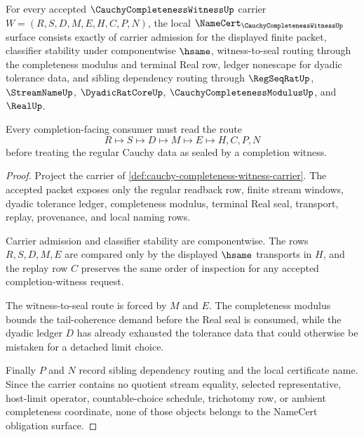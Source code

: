 \begin{theorem}
\label{thm:cauchy-completeness-witness-namecert-obligations}
For every accepted $\CauchyCompletenessWitnessUp$ carrier $W=(R,S,D,M,E,H,C,P,N)$, the local $\NameCert_{\CauchyCompletenessWitnessUp}$ surface consists exactly of carrier admission for the displayed finite packet, classifier stability under componentwise $\hsame$, witness-to-seal routing through the completeness modulus and terminal Real row, ledger nonescape for dyadic tolerance data, and sibling dependency routing through $\RegSeqRatUp$, $\StreamNameUp$, $\DyadicRatCoreUp$, $\CauchyCompletenessModulusUp$, and $\RealUp$.

Every completion-facing consumer must read the route
$$
R\longmapsto S\longmapsto D\longmapsto M\longmapsto E\longmapsto H,C,P,N
$$
before treating the regular Cauchy data as sealed by a completion witness.
\end{theorem}
\begin{proof}
Project the carrier of \autoref{def:cauchy-completeness-witness-carrier}. The accepted packet exposes only the regular readback row, finite stream windows, dyadic tolerance ledger, completeness modulus, terminal Real seal, transport, replay, provenance, and local naming rows.

Carrier admission and classifier stability are componentwise. The rows $R,S,D,M,E$ are compared only by the displayed $\hsame$ transports in $H$, and the replay row $C$ preserves the same order of inspection for any accepted completion-witness request.

The witness-to-seal route is forced by $M$ and $E$. The completeness modulus bounds the tail-coherence demand before the Real seal is consumed, while the dyadic ledger $D$ has already exhausted the tolerance data that could otherwise be mistaken for a detached limit choice.

Finally $P$ and $N$ record sibling dependency routing and the local certificate name. Since the carrier contains no quotient stream equality, selected representative, host-limit operator, countable-choice schedule, trichotomy row, or ambient completeness coordinate, none of those objects belongs to the NameCert obligation surface.
\end{proof}

